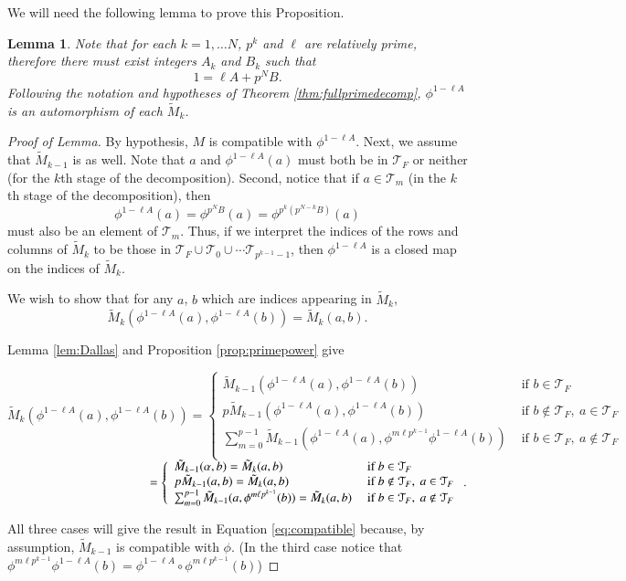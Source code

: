 \documentclass[preprint,12pt]{elsarticle}
\def \a{\alpha} \def \b{\beta} \def \g{\gamma} \def \d{\delta}
\newcommand{\cT}{\mathcal{T}}
\newcommand{\tM}{\tilde{M}}
\newtheorem{lem}[thm]{Lemma}
\theoremstyle{definition}
\theoremstyle{remark}
\begin{document}
We will need the following lemma to prove this Proposition.
\begin{lem}\label{lem:compatible}
 Note that for each $k = 1, \ldots N$,  $p^k$ and $\ell$ are relatively prime, therefore there must exist integers $A_k$ and $B_k$ such that
\[
1 = \ell A+ p^N B.
\]
 Following the notation and hypotheses of Theorem \ref{thm:fullprimedecomp}, $\phi^{1-\ell A}$ is an automorphism of each $\tM_k$.
   \end{lem}
 \begin{proof}[Proof of Lemma]
 By hypothesis, $M$ is compatible with $\phi^{1-\ell A}$.  Next, we assume that $\tM_{k-1}$ is as well. Note that $a$ and $\phi^{1-\ell A}(a)$ must both be in $\cT_F$ or neither (for the $k$th stage of the decomposition). Second, notice that if $a \in \cT_m$ (in the $k$th stage of the decomposition), then
 \[
\phi^{1-\ell A}(a) = \phi^{p^NB}(a) = \phi^{p^k(p^{N-k}B)}(a)
 \]
 must also be an element of $\cT_m$. Thus, if we interpret the indices of the rows and columns of $\tM_k$ to be those in $\cT_F \cup \cT_0 \cup \cdots \cT_{p^{k-1}-1}$, then $\phi^{1 - \ell A}$ is a closed map on the indices of $\tM_k$.

 We wish to show that for any $a$, $b$ which are indices appearing in $\tM_k$,
 \begin{equation}\label{eq:compatible}
 \tM_k(\phi^{1-\ell A}(a),\phi^{1-\ell A}(b)) = \tM_k(a,b).\end{equation}

Lemma \ref{lem:Dallas} and  Proposition \ref{prop:primepower} give
\begin{center}
$
 \tM_k(\phi^{1-\ell A}(a), \phi^{1-\ell A}(b)) = \left\{\begin{array}{ll}
 \tM_{k-1}(\phi^{1-\ell A}(a), \phi^{1-\ell A}(b)) & \text{ if } b \in \cT_F \\
 p\tM_{k-1}(\phi^{1-\ell A}(a), \phi^{1-\ell A}(b)) & \text{ if } b \notin \cT_F, \ a \in \cT_F \\
 \sum_{m=0}^{p-1}\tM_{k-1}(\phi^{1-\ell A}(a), \phi^{m\ell p^{k-1}}\phi^{1-\ell A}(b)) & \text{ if } b \in \cT_F, \ a \notin \cT_F  \\
 \end{array}\right.
 $\\[4mm]

$
\hspace*{4cm} =\left\{\begin{array}{ll}
 \tM_{k-1}(\a,b)= \tM_k(a,b) & \text{ if } b \in \cT_F \\
 p\tM_{k-1}(a, b) = \tM_k(a,b) & \text{ if } b \notin \cT_F, \ a \in \cT_F \\
 \sum_{m=0}^{p-1}\tM_{k-1}(a, \phi^{m\ell p^{k-1}}(b)) = \tM_k(a,b)& \text{ if } b \in \cT_F, \ a \notin \cT_F  \\
 \end{array}\right. .
 $
 \end{center}
 All three cases will give the result in Equation \ref{eq:compatible} because, by assumption, $\tM_{k-1}$ is compatible with $\phi$. (In the third case notice that $\phi^{m\ell p^{k-1}}\phi^{1-\ell A}(b) =\phi^{1-\ell A}\circ \phi^{m\ell p^{k-1}}(b)$)
 \end{proof}
\end{document}
